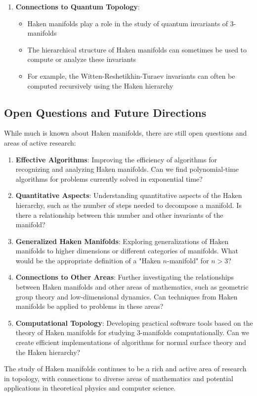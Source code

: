 \documentclass{article}
\begin{document}
\begin{enumerate}
  \item \textbf{Connections to Quantum Topology}:
  \begin{itemize}
    \item Haken manifolds play a role in the study of quantum invariants of 3-manifolds
    \item The hierarchical structure of Haken manifolds can sometimes be used to compute or analyze these invariants
    \item For example, the Witten-Reshetikhin-Turaev invariants can often be computed recursively using the Haken hierarchy
  \end{itemize}
\end{enumerate}

\subsection{Open Questions and Future Directions}

While much is known about Haken manifolds, there are still open questions and areas of active research:

\begin{enumerate}
  \item \textbf{Effective Algorithms}: Improving the efficiency of algorithms for recognizing and analyzing Haken manifolds. Can we find polynomial-time algorithms for problems currently solved in exponential time?
  
  \item \textbf{Quantitative Aspects}: Understanding quantitative aspects of the Haken hierarchy, such as the number of steps needed to decompose a manifold. Is there a relationship between this number and other invariants of the manifold?
  
  \item \textbf{Generalized Haken Manifolds}: Exploring generalizations of Haken manifolds to higher dimensions or different categories of manifolds. What would be the appropriate definition of a "Haken $n$-manifold" for $n > 3$?
  
  \item \textbf{Connections to Other Areas}: Further investigating the relationships between Haken manifolds and other areas of mathematics, such as geometric group theory and low-dimensional dynamics. Can techniques from Haken manifolds be applied to problems in these areas?
  
  \item \textbf{Computational Topology}: Developing practical software tools based on the theory of Haken manifolds for studying 3-manifolds computationally. Can we create efficient implementations of algorithms for normal surface theory and the Haken hierarchy?
\end{enumerate}

The study of Haken manifolds continues to be a rich and active area of research in topology, with connections to diverse areas of mathematics and potential applications in theoretical physics and computer science.
\end{document}
